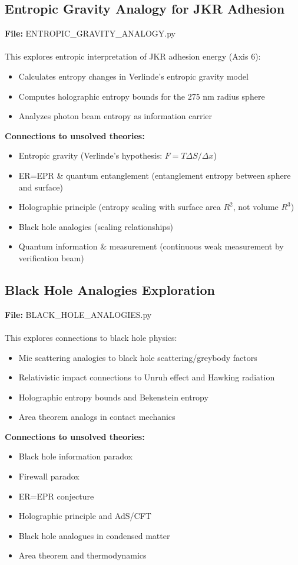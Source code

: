 \documentclass[11pt]{article}
\begin{document}
\subsection{Entropic Gravity Analogy for JKR Adhesion}
\textbf{File:} ENTROPIC\_GRAVITY\_ANALOGY.py
\\\\
This explores entropic interpretation of JKR adhesion energy (Axis 6):
\begin{itemize}
\item Calculates entropy changes in Verlinde's entropic gravity model
\item Computes holographic entropy bounds for the 275 nm radius sphere
\item Analyzes photon beam entropy as information carrier
\end{itemize}
\textbf{Connections to unsolved theories:}
\begin{itemize}
\item Entropic gravity (Verlinde's hypothesis: $F = T \Delta S/\Delta x$)
\item ER=EPR \& quantum entanglement (entanglement entropy between sphere and surface)
\item Holographic principle (entropy scaling with surface area $R^2$, not volume $R^3$)
\item Black hole analogies (scaling relationships)
\item Quantum information \& measurement (continuous weak measurement by verification beam)
\end{itemize}

\subsection{Black Hole Analogies Exploration}
\textbf{File:} BLACK\_HOLE\_ANALOGIES.py
\\\\
This explores connections to black hole physics:
\begin{itemize}
\item Mie scattering analogies to black hole scattering/greybody factors
\item Relativistic impact connections to Unruh effect and Hawking radiation
\item Holographic entropy bounds and Bekenstein entropy
\item Area theorem analogs in contact mechanics
\end{itemize}
\textbf{Connections to unsolved theories:}
\begin{itemize}
\item Black hole information paradox
\item Firewall paradox
\item ER=EPR conjecture
\item Holographic principle and AdS/CFT
\item Black hole analogues in condensed matter
\item Area theorem and thermodynamics
\end{itemize}
\end{document}
